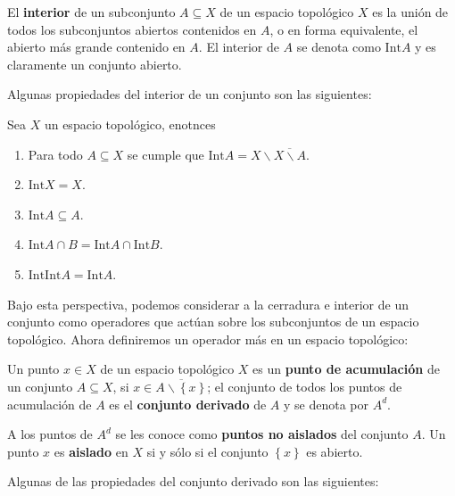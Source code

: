 \documentclass[12pt]{report}
\theoremstyle{largebreak}
\newcommand{\Int}[1]{\text{Int}\ensuremath{#1}}
\begin{document}
    \begin{mydef}
        El \textbf{interior} de un subconjunto $A\subseteq X$ de un espacio topológico $X$ es la unión de todos los subconjuntos abiertos contenidos en $A$, o en forma equivalente, el abierto más grande contenido en $A$. El interior de $A$ se denota como $\Int{A}$ y es claramente un conjunto abierto.
    \end{mydef}

    Algunas propiedades del interior de un conjunto son las siguientes:

    \begin{propo}
        Sea $X$ un espacio topológico, enotnces
        \begin{enumerate}
            \item Para todo $A\subseteq X$ se cumple que $\Int{A}=X\backslash\overline{X\backslash A}$.
            \item $\Int{X}=X$.
            \item $\Int{A}\subseteq A$.
            \item $\Int{A\cap B}=\Int{A}\cap\Int{B}$.
            \item $\Int{\Int{A}}=\Int{A}$.
        \end{enumerate}
    \end{propo}

    Bajo esta perspectiva, podemos considerar a la cerradura e interior de un conjunto como operadores que actúan sobre los subconjuntos de un espacio topológico. Ahora definiremos un operador más en un espacio topológico:

    \begin{mydef}
        Un punto $x\in X$ de un espacio topológico $X$ es un \textbf{punto de acumulación} de un conjunto $A\subseteq X$, si $x\in\overline{A\backslash\left\{x\right\}}$; el conjunto de todos los puntos de acumulación de $A$ es el \textbf{conjunto derivado} de $A$ y se denota por $A^d$.

        A los puntos de $A^d$ se les conoce como \textbf{puntos no aislados} del conjunto $A$. Un punto $x$ es \textbf{aislado} en $X$ si y sólo si el conjunto $\left\{x\right\}$ es abierto.
    \end{mydef}

    Algunas de las propiedades del conjunto derivado son las siguientes:
\end{document}
